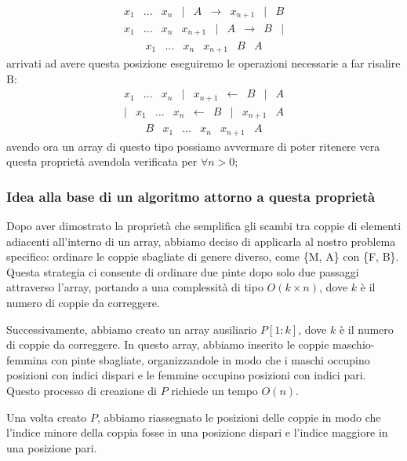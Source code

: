 \documentclass{article}
\begin{document}
\begin{itemize}
\[\begin{array}{cccccccccc}
	\end{array}
	\]
	\[
	\begin{array}{cccccccccc}
		x_1 & \dots & x_n & | & A & \rightarrow & x_{n+1} & | & B
	\end{array}
	\]
	\[
	\begin{array}{cccccccccc}
		x_1 & \dots & x_n & x_{n+1} & | & A & \rightarrow & B & |
	\end{array}
	\]
	\[
	\begin{array}{ccccccc}
		x_1 & \dots & x_n & x_{n+1} & B & A
	\end{array}
	\]
	arrivati ad avere questa posizione eseguiremo le operazioni necessarie a far risalire B:
	\[
	\begin{array}{cccccccccc}
		x_1 & \dots & x_n & | & x_{n+1} & \leftarrow & B &| & A 
	\end{array}
	\]
	\[
	\begin{array}{cccccccccc}
		 | & x_1 & \dots & x_n & \leftarrow & B &| & x_{n+1} & A 
	\end{array}
	\]
	\[
	\begin{array}{ccccccc}
		B & x_1 & \dots & x_n & x_{n+1} & A
	\end{array}
	\]
	avendo ora un array di questo tipo possiamo avvermare di poter ritenere vera questa proprietà avendola verificata per $\forall n > 0$;
\end{itemize}
\subsubsection{Idea alla base di un algoritmo attorno a questa proprietà}
Dopo aver dimostrato la proprietà che semplifica gli scambi tra coppie di elementi adiacenti all'interno di un array, abbiamo deciso di applicarla al nostro problema specifico: ordinare le coppie sbagliate di genere diverso, come \{M, A\} con \{F, B\}. Questa strategia ci consente di ordinare due pinte dopo solo due passaggi attraverso l'array, portando a una complessità di tipo \(O(k \times n)\), dove \(k\) è il numero di coppie da correggere.

Successivamente, abbiamo creato un array ausiliario \(P[1:k]\), dove \(k\) è il numero di coppie da correggere. In questo array, abbiamo inserito le coppie maschio-femmina con pinte sbagliate, organizzandole in modo che i maschi occupino posizioni con indici dispari e le femmine occupino posizioni con indici pari. Questo processo di creazione di \(P\) richiede un tempo \(O(n)\).

Una volta creato \(P\), abbiamo riassegnato le posizioni delle coppie in modo che l'indice minore della coppia fosse in una posizione dispari e l'indice maggiore in una posizione pari.
\end{document}
